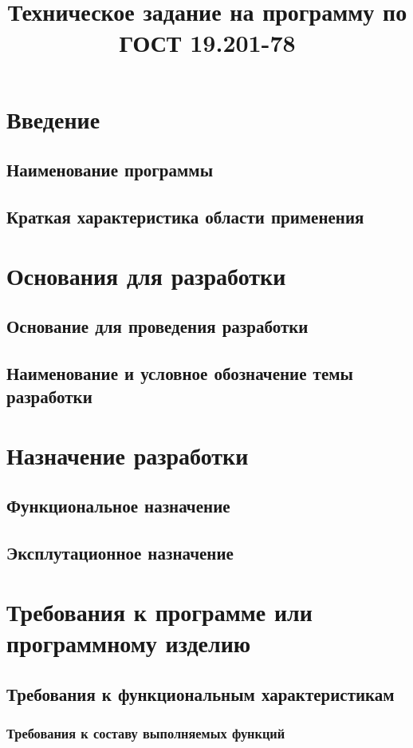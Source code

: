\documentclass[a4paper,10pt]{article}
\title{Техническое задание на программу по ГОСТ 19.201-78}
\author{}
\date{}
\begin{document}
\maketitle


\section{Введение}
\subsection{Наименование программы}
\subsection{Краткая характеристика области применения}
\section{Основания для разработки}
\subsection{Основание для проведения разработки}
\subsection{Наименование и условное обозначение темы разработки}
\section{Назначение разработки}
\subsection{Функциональное назначение}
\subsection{Эксплутационное назначение}
\section{Требования к программе или программному изделию}
\subsection{Требования к функциональным характеристикам}
\subsubsection{Требования к составу выполняемых функций}
\end{document}
